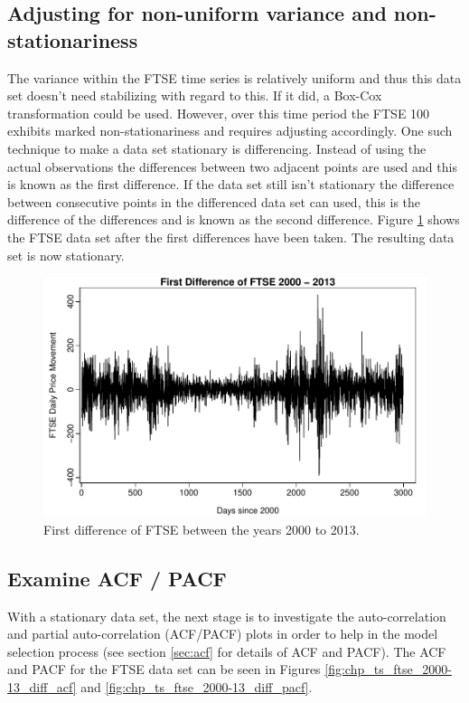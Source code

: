 \subsection{Adjusting for non-uniform variance and non-stationariness}
The variance within the FTSE time series is relatively uniform and thus this data set doesn't need stabilizing with regard to this. If it did, a Box-Cox transformation could be used. However, over this time period the FTSE 100 exhibits marked non-stationariness and requires adjusting accordingly. One such technique to make a data set stationary is differencing. Instead of using the actual observations the differences between two adjacent points are used and this is known as the first difference. If the data set still isn't stationary the difference between consecutive points in the differenced data set can used, this is the difference of the differences and is known as the second difference. Figure \ref{fig:chp_ts_ftse_2000_13_diff} shows the FTSE data set after the first differences have been taken.  The resulting data set is now stationary.

\begin{figure}[tbh]
\centering
\includegraphics{Figures/chp_ts_ftse_2000-13_diff}
\caption[First difference of FTSE between the years 2000 to 2013]{First difference of FTSE between the years 2000 to 2013.}
\label{fig:chp_ts_ftse_2000_13_diff}
\end{figure}

\subsection{Examine ACF / PACF}
With a stationary data set, the next stage is to investigate the auto-correlation and partial auto-correlation (ACF/PACF) plots in order to help in the model selection process (see section \ref{sec:acf} for details of ACF and PACF). The ACF and PACF for the FTSE data set can be seen in Figures \ref{fig:chp_ts_ftse_2000-13_diff_acf} and \ref{fig:chp_ts_ftse_2000-13_diff_pacf}. 

